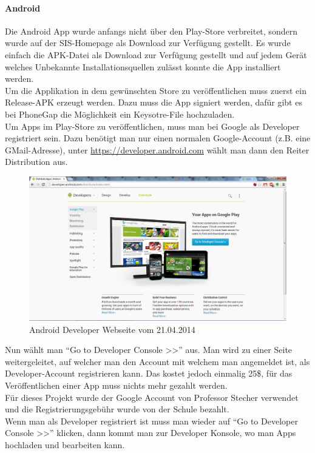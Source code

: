 \paragraph{Android\\}
Die Android App wurde anfangs nicht über den Play-Store verbreitet, sondern wurde auf der SIS-Homepage als Download zur Verfügung gestellt. Es wurde einfach die APK-Datei als Download zur Verfügung gestellt und auf jedem Gerät welches Unbekannte Installationsquellen zulässt konnte die App installiert werden.\\
Um die Applikation in dem gewünschten Store zu veröffentlichen muss zuerst ein Release-APK erzeugt werden. Dazu muss die App signiert werden, dafür gibt es bei PhoneGap die Möglichkeit ein Keysotre-File hochzuladen. \\
Um Apps im Play-Store zu veröffentlichen, muss man bei Google als Developer registriert sein. Dazu benötigt man nur einen normalen Google-Account (z.B. eine GMail-Adresse), unter \href{https://developer.android.com}{https://developer.android.com} wählt man dann den Reiter Distribution aus.\\

\begin{figure}[H]
\includegraphics[keepaspectratio=true, width=14cm]{images/appstores/AndroidDeveloper1.png}
\caption{Android Developer Webseite vom 21.04.2014}
\end{figure}

Nun wählt man \enquote{Go to Developer Console >>} aus. Man wird zu einer Seite weitergeleitet, auf welcher man den Account mit welchem man angemeldet ist, als Developer-Account registrieren kann. Das kostet jedoch einmalig 25\$, für das Veröffentlichen einer App muss nichts mehr gezahlt werden.\\
Für dieses Projekt wurde der Google Account von Professor Stecher verwendet und die Registrierungsgebühr wurde von der Schule bezahlt.\\
Wenn man als Developer registriert ist muss man wieder auf \enquote{Go to Developer Console >>} klicken, dann kommt man zur Developer Konsole, wo man Apps hochladen und bearbeiten kann.\\

